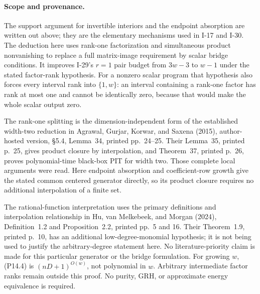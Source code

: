\paragraph{Scope and provenance.}
The support argument for invertible interiors and the endpoint
absorption are written out above; they are the elementary
mechanisms used in I-17 and I-30. The deduction here uses
rank-one factorization and simultaneous product nonvanishing
to replace a full matrix-image requirement by scalar bridge
conditions. It improves I-29's $r=1$ pair budget from $3w-3$
to $w-1$ under the stated factor-rank hypothesis. For a
nonzero scalar program that hypothesis also forces every
interval rank into $\{1,w\}$: an interval containing a rank-one
factor has rank at most one and cannot be identically zero,
because that would make the whole scalar output zero.

The rank-one splitting is the dimension-independent form of
the established width-two reduction in Agrawal, Gurjar,
Korwar, and Saxena (2015), author-hosted version,
\S5.4, Lemma~34, printed pp.~24--25. Their Lemma~35,
printed p.~25, gives product closure by interpolation, and
Theorem~37, printed p.~26, proves polynomial-time black-box
PIT for width two. Those complete local arguments were read.
Here endpoint absorption and coefficient-row growth give the
stated common centered generator directly, so its product
closure requires no additional interpolation of a finite set.

The rational-function interpretation uses the primary
definitions and interpolation relationship in Hu, van
Melkebeek, and Morgan (2024), Definition~1.2 and
Proposition~2.2, printed pp.~5 and 16. Their Theorem~1.9,
printed p.~10, has an additional low-degree-monomial
hypothesis; it is not being used to justify the arbitrary-degree
statement here. No literature-priority claim is made for
this particular generator or the bridge formulation.
For growing $w$, (P14.4) is $(nD+1)^{O(w)}$, not polynomial
in $w$. Arbitrary intermediate factor ranks remain outside
this proof. No purity, GRH, or approximate energy equivalence
is required.
